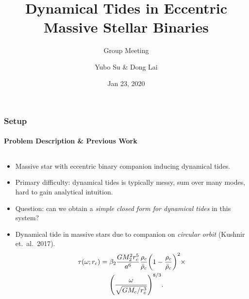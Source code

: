 \documentclass[dvipsnames,8pt]{beamer}
\DeclarePairedDelimiter\p{\lparen}{\rparen}
\begin{document}
\title{Dynamical Tides in Eccentric Massive Stellar Binaries}
\subtitle{Group Meeting}
\author{Yubo Su \& Dong Lai}
\date{Jan 23, 2020}

\maketitle

\begin{frame}
    \frametitle{Setup}
    \framesubtitle{Problem Description \& Previous Work}

    \begin{columns}
        \begin{column}{0.5\textwidth}
            \begin{itemize}
                \item Massive star with eccentric binary companion inducing dynamical
                    tides.

                \item Primary difficulty: dynamical tides is typically messy, sum over
                    many modes, hard to gain analytical intuition.

                \item Question: can we obtain a \emph{simple closed form for dynamical
                    tides} in this system?

                \item Dynamical tide in massive stars due to companion on \emph{circular
                    orbit} (Kushnir et.\ al.\ 2017).
                    \begin{align*}
                        \tau(\omega; r_c) ={}& \beta_2\frac{GM_2^2r_c^5}{a^6}
                                \frac{\rho_c}{\bar{\rho}_c} \p*{1 -
                                \frac{\rho_c}{\bar{\rho}_c}}^2\times\\
                            &\p*{\frac{\omega}{\sqrt{GM_c/r_c^3}}}^{8/3}.
                    \end{align*}


\end{itemize}
\end{column}
\end{columns}
\end{frame}
\end{document}
